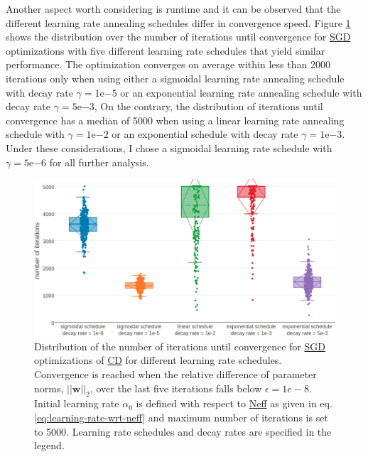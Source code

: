 \documentclass[11pt,a4paper,twoside]{book}
\newcommand{\eq}{\!=\!}
\newcommand{\w}{\mathbf{w}}
\theoremstyle{definition}
\theoremstyle{definition}
\theoremstyle{remark}
\begin{document}
Another aspect worth considering is runtime and it can be observed that
the different learning rate annealing schedules differ in convergence
speed. Figure \ref{fig:distribution-num-iterations} shows the
distribution over the number of iterations until convergence for
\protect\hyperlink{abbrev}{SGD} optimizations with five different
learning rate schedules that yield similar performance. The optimization
converges on average within less than 2000 iterations only when using
either a sigmoidal learning rate annealing schedule with decay rate
\(\gamma \eq 1\mathrm{e}{-5}\) or an exponential learning rate annealing
schedule with decay rate \(\gamma \eq 5\mathrm{e}{-3}\), On the
contrary, the distribution of iterations until convergence has a median
of 5000 when using a linear learning rate annealing schedule with
\(\gamma \eq 1\mathrm{e}{-2}\) or an exponential schedule with decay
rate \(\gamma \eq 1\mathrm{e}{-3}\). Under these considerations, I chose
a sigmoidal learning rate schedule with \(\gamma \eq 5\mathrm{e}{-6}\)
for all further analysis.












\begin{figure}

{\centering \includegraphics[width=1\linewidth]{img/full_likelihood/sgd/distribution_numiterations_against_selected_learningrate_schedules} 

}

\caption{Distribution of the number of
iterations until convergence for \protect\hyperlink{abbrev}{SGD}
optimizations of \protect\hyperlink{abbrev}{CD} for different learning
rate schedules. Convergence is reached when the relative difference of
parameter norms, \(||\w||_2\), over the last five iterations falls below
\(\epsilon \eq 1e-8\). Initial learning rate \(\alpha_0\) is defined
with respect to \protect\hyperlink{abbrev}{Neff} as given in eq.
\eqref{eq:learning-rate-wrt-neff} and maximum number of iterations is set
to 5000. Learning rate schedules and decay rates are specified in the
legend.}\label{fig:distribution-num-iterations}
\end{figure}
\end{document}
